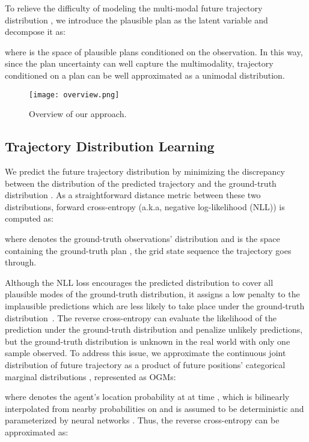 \documentclass[10pt,twocolumn,letterpaper]{article}
\begin{document}
To relieve the difficulty of modeling the multi-modal future trajectory distribution , we introduce the plausible plan as the latent variable and decompose it as:

where  is the space of plausible plans conditioned on the observation. In this way, since the plan uncertainty can well capture the multimodality, trajectory conditioned on a plan can be well approximated as a unimodal distribution.

\begin{figure*}[t]
	\centering
	\texttt{[image: overview.png]}
	\vspace{-0.7cm}
	\caption{Overview of our approach.}
	\vspace{-0.5cm}
	\label{fig:overview}
\end{figure*}

\subsection{Trajectory Distribution Learning}

We predict the future trajectory distribution by minimizing the discrepancy between the distribution  of the predicted trajectory  and the ground-truth distribution . As a straightforward distance metric between these two distributions, forward cross-entropy (a.k.a, negative log-likelihood (NLL)) is computed as:

where  denotes the ground-truth observations' distribution and  is the space containing the ground-truth plan , \ie the grid state sequence the trajectory  goes through.

Although the NLL loss encourages the predicted distribution to cover all plausible modes of the ground-truth distribution, it assigns a low penalty to the implausible predictions which are less likely to take place under the ground-truth distribution~\cite{rhinehart2018r2p2,park2020diverse}. The reverse cross-entropy  can evaluate the likelihood of the prediction under the ground-truth distribution and penalize unlikely predictions, but the ground-truth distribution  is unknown in the real world with only one sample observed. To address this issue, we approximate the continuous joint distribution  of future trajectory as a product of future positions' categorical marginal distributions , represented as OGMs:

where  denotes the agent's location probability at  at time , which is bilinearly interpolated from nearby probabilities on  and  is assumed to be deterministic and parameterized by neural networks . Thus, the reverse cross-entropy  can be approximated as:
\end{document}
